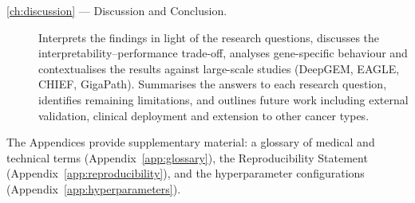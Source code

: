 \begin{description}
    \item[\cref{ch:discussion} --- Discussion and Conclusion.]
    Interprets the findings in light of the research questions,
    discusses the interpretability--performance trade-off, analyses
    gene-specific behaviour and contextualises the results against
    large-scale studies (DeepGEM, EAGLE, CHIEF, GigaPath).
    Summarises the answers to each research question, identifies
    remaining limitations, and outlines future work including external
    validation, clinical deployment and extension to other cancer types.
\end{description}

The Appendices provide supplementary material: a glossary of medical and technical terms (Appendix~\ref{app:glossary}), the Reproducibility Statement (Appendix~\ref{app:reproducibility}), and the hyperparameter configurations (Appendix~\ref{app:hyperparameters}).
